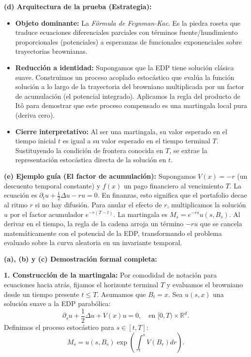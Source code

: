 \documentclass[11pt, letterpaper]{article}
\begin{document}
\begin{solucion}
    \textbf{(d) Arquitectura de la prueba (Estrategia):}
    \begin{itemize}
        \item[(i)] \textbf{Objeto dominante:} La \textit{Fórmula de Feynman-Kac}. Es la piedra roseta que traduce ecuaciones diferenciales parciales con términos fuente/hundimiento proporcionales (potenciales) a esperanzas de funcionales exponenciales sobre trayectorias brownianas.
        \item[(ii)] \textbf{Reducción a identidad:} Supongamos que la EDP tiene solución clásica suave. Construimos un proceso acoplado estocástico que evalúa la función solución a lo largo de la trayectoria del browniano multiplicada por un factor de acumulación (el potencial integrado). Aplicamos la regla del producto de Itô para demostrar que este proceso compensado es una martingala local pura (deriva cero).
        \item[(iii)] \textbf{Cierre interpretativo:} Al ser una martingala, su valor esperado en el tiempo inicial $t$ es igual a su valor esperado en el tiempo terminal $T$. Sustituyendo la condición de frontera conocida en $T$, se extrae la representación estocástica directa de la solución en $t$.
    \end{itemize}

    \vspace{3mm}
    \textbf{(e) Ejemplo guía (El factor de acumulación):}
    Supongamos $V(x) = -r$ (un descuento temporal constante) y $f(x)$ un pago financiero al vencimiento $T$. La ecuación es $\partial_t u + \frac{1}{2}\Delta u - r u = 0$.
    En finanzas, esto significa que el portafolio decae al ritmo $r$ si no hay difusión. 
    Para anular el efecto de $r$, multiplicamos la solución $u$ por el factor acumulador $e^{-r(T-t)}$. La martingala es $M_s = e^{-rs} u(s, B_s)$.
    Al derivar en el tiempo, la regla de la cadena arroja un término $-r u$ que se cancela matemáticamente con el potencial de la EDP, transformando el problema evaluado sobre la curva aleatoria en un invariante temporal.

    \textbf{(a), (b) y (c) Demostración formal completa:}

    \textbf{1. Construcción de la martingala:}
    Por comodidad de notación para ecuaciones hacia atrás, fijamos el horizonte terminal $T$ y evaluamos el browniano desde un tiempo presente $t \le T$. Asumamos que $B_t = x$.
    Sea $u(s, x)$ una solución suave a la EDP parabólica:
    \[ \partial_s u + \frac{1}{2}\Delta u + V(x)u = 0, \quad \text{en } [0,T) \times \mathbb{R}^d. \]
    Definimos el proceso estocástico para $s \in [t, T]$:
    \[ M_s = u(s, B_s) \exp\left( \int_t^s V(B_r) dr \right). \]


\end{solucion}
\end{document}
